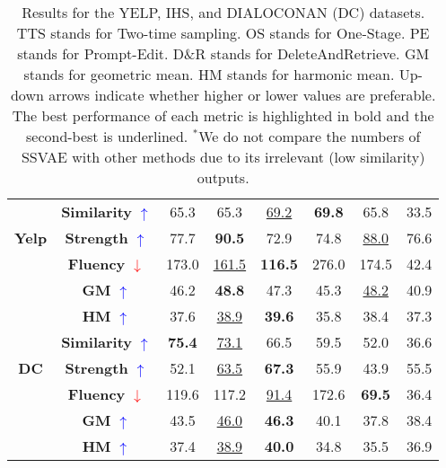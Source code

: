 \documentclass{article}
\begin{document}
\begin{table*}[htbp]
\begin{scriptsize}
{\begin{tabular}{c|c|c|c|c|c|c|c}
    \multirow{3}{*}{\textbf{Yelp}} & \textbf{Similarity} \textcolor{blue}{$\uparrow$} & 65.3 & 65.3 & \underline{69.2} & \textbf{69.8} & 65.8  & 33.5\\ 
    & \textbf{Strength} \textcolor{blue}{$\uparrow$} & 77.7 & \textbf{90.5} & 72.9 & 74.8 & \underline{88.0} & 76.6 \\ 
    & \textbf{Fluency} \textcolor{red}{$\downarrow$} & 173.0 & \underline{161.5} & \textbf{116.5} & 276.0 & 174.5 & 42.4 \\
    & \textbf{GM} \textcolor{blue}{$\uparrow$} & 46.2 & \textbf{48.8} & 47.3 & 45.3  & \underline{48.2} & 40.9\\
    & \textbf{HM} \textcolor{blue}{$\uparrow$} & 37.6 & \underline{38.9} & \textbf{39.6} & 35.8 & 38.4 & 37.3\\ \hline
    \multirow{3}{*}{\textbf{DC}} & \textbf{Similarity} \textcolor{blue}{$\uparrow$} & \textbf{75.4} & \underline{73.1} & 66.5 & 59.5 & 52.0 & 36.6\\ 
    & \textbf{Strength} \textcolor{blue}{$\uparrow$} & 52.1 & \underline{63.5} & \textbf{67.3} & 55.9 & 43.9 & 55.5\\ 
    & \textbf{Fluency} \textcolor{red}{$\downarrow$} &  119.6 & 117.2 & \underline{91.4} & 172.6 & \textbf{69.5} & 36.4\\
    & \textbf{GM} \textcolor{blue}{$\uparrow$} & 43.5& \underline{46.0}& \textbf{46.3} & 40.1 & 37.8 & 38.4\\
    & \textbf{HM} \textcolor{blue}{$\uparrow$} & 37.4& \underline{38.9}& \textbf{40.0} & 34.8 & 35.5 & 36.9 \\ \hline
    \end{tabular}%
    }
    \end{scriptsize}
    \caption{Results for the YELP, IHS, and DIALOCONAN (DC) datasets. TTS stands for Two-time sampling. OS stands for One-Stage. PE stands for Prompt-Edit. D\&R stands for DeleteAndRetrieve. GM stands for geometric mean. HM stands for harmonic mean. Up-down arrows indicate whether higher or lower values are preferable. The best performance of each metric is highlighted in bold and the second-best is underlined. $^*$We do not compare the numbers of SSVAE with other methods due to its irrelevant (low similarity) outputs.}
    \label{tab:results-combined}
\end{table*}
\end{document}
